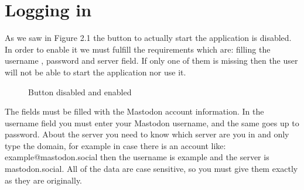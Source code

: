 \section{Logging in}
\label{s:Logging_in}
As we saw in Figure 2.1 the button to actually start the application is disabled.
In order to enable it we must fulfill the requirements which are: filling the username
, password and server field. If only one of them is missing then the user will not be able
to start the application nor use it. 
\begin{figure}[H]
	\centering
	\hspace{5pt}
	\caption{Button disabled and enabled}
	\label{fig:buttonenabled}
\end{figure}
The fields must be filled with the Mastodon account information.
\newline
In the username field you must enter your Mastodon username, and the
same goes up to password. About the server you need to know which server
are you in and only type the domain, for example in case there is an account
like: example@mastodon.social then the username is example and the server is
mastodon.social. All of the data are case sensitive, so you must give them
exactly as they are originally.

